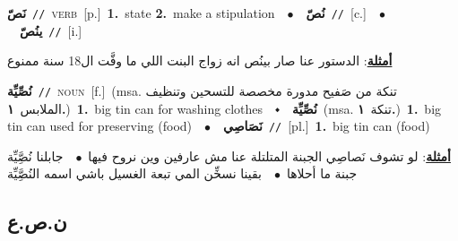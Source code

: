 \documentclass[10pt,a4paper,twoside]{article} %
\begin{document}
\begin{multicols}{2}
{\setlength\topsep{0pt}\textbf{\foreignlanguage{arabic}{نَصّ}}\ {\color{gray}\texttt{//}\color{black}}\ \textsc{verb}\ [p.]\ \textbf{1.}~state  \textbf{2.}~make a stipulation\ \ $\bullet$\ \ \setlength\topsep{0pt}\textbf{\foreignlanguage{arabic}{نُصّ}}\ {\color{gray}\texttt{//}\color{black}}\ [c.]\ \ $\bullet$\ \ \setlength\topsep{0pt}\textbf{\foreignlanguage{arabic}{ينُصّ}}\ {\color{gray}\texttt{//}\color{black}}\ [i.]\  \begin{flushright}\color{gray}\foreignlanguage{arabic}{\textbf{\underline{\foreignlanguage{arabic}{أمثلة}}}: الدستور عنا صار بينُص انه زواج البنت اللي ما وفَّت ال18 سنة ممنوع}\end{flushright}\color{black}} \vspace{2mm}

{\setlength\topsep{0pt}\textbf{\foreignlanguage{arabic}{نُصِّيِّة}}\ {\color{gray}\texttt{//}\color{black}}\ \textsc{noun}\ [f.]\ \color{gray}(msa. \foreignlanguage{arabic}{تنكة من صَفيح مدورة مخصصة للتسحين وتنظيف الملابس}~\foreignlanguage{arabic}{\textbf{١.}})\color{black}\ \textbf{1.}~big tin can for washing clothes\ \ $\smblkdiamond$\ \ \setlength\topsep{0pt}\textbf{\foreignlanguage{arabic}{نُصِّيِّة}}\ \color{gray}(msa. \foreignlanguage{arabic}{تنكة}~\foreignlanguage{arabic}{\textbf{١.}})\color{black}\ \textbf{1.}~big tin can used for preserving (food)\ \ $\bullet$\ \ \setlength\topsep{0pt}\textbf{\foreignlanguage{arabic}{نَصَاصِي}}\ {\color{gray}\texttt{//}\color{black}}\ [pl.]\ \textbf{1.}~big tin can (food)\  \begin{flushright}\color{gray}\foreignlanguage{arabic}{\textbf{\underline{\foreignlanguage{arabic}{أمثلة}}}: لو تشوف نَصاصِي الجبنة المتلتلة عنا مش عارفين وين نروح فيها\ $\bullet$\ \  جابلنا نُصَِّيِّة جبنة ما أحلاها\ $\bullet$\ \  بقينا نسخِّن المي تبعة الغسيل باشي اسمه النُصَِّيِّة}\end{flushright}\color{black}} \vspace{2mm}

\vspace{-3mm}
\subsection*{\color{blue}\foreignlanguage{arabic}{ن.ص.ع}\color{blue}{}} 


\end{multicols}
\end{document}
